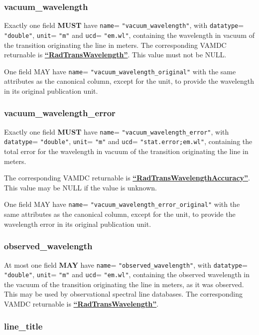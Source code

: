 \documentclass[11pt,a4paper]{ivoa}
\def\attrval#1#2{\texttt{#1}\discretionary{}{}{}=\discretionary{}{}{}%
  \texttt{"#2"}}
\def\vamdcret#1{\href{https://dictionary.vamdc.eu/returnables/\##1}{\textbf{``\color{vamdccolor}#1''}}}
\begin{document}
\subsubsection{vacuum\_wavelength}

Exactly one field \textbf{MUST} have \attrval{name}{vacuum\_wavelength},
with \attrval{datatype}{double}, \attrval{unit}{m} and
\attrval{ucd}{em.wl}, containing the wavelength in
vacuum of the transition originating the line in meters.
The corresponding VAMDC returnable is \vamdcret{RadTransWavelength}.
This value must not be NULL.

One field MAY have \attrval{name}{vacuum\_wavelength\_original} with the same attributes
as the canonical column, except for the unit, to provide the wavelength
in its original publication unit.

\subsubsection{vacuum\_wavelength\_error}

Exactly one field \textbf{MUST} have \attrval{name}{vacuum\_wavelength\_error},
with \attrval{datatype}{double}, \attrval{unit}{m} and
\attrval{ucd}{stat.error;em.wl}, containing the total error for the wavelength in
vacuum of the transition originating the line in meters.

The corresponding VAMDC returnable is \vamdcret{RadTransWavelengthAccuracy}.
This value may be NULL if the value is unknown.

One field MAY have \attrval{name}{vacuum\_wavelength\_error\_original} with the same attributes
as the canonical column, except for the unit, to provide the wavelength error
in its original publication unit.


\subsubsection{observed\_wavelength}

At most one field \textbf{MAY} have \attrval{name}{observed\_wavelength}, with
\attrval{datatype}{double}, \attrval{unit}{m} and \attrval{ucd}{em.wl}, containing the observed wavelength in the vacuum of
the transition originating the line in meters, as it was observed.
This may be used by observational spectral line databases.
The corresponding VAMDC returnable is \vamdcret{RadTransWavelength}.


\subsubsection{line\_title}
\end{document}
